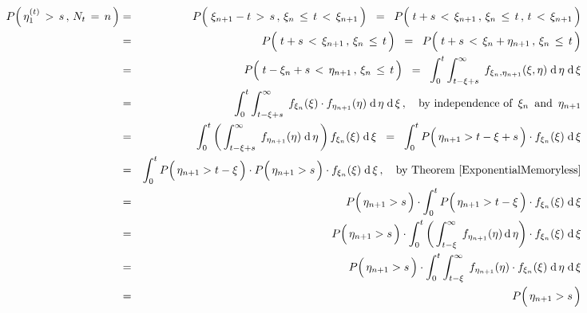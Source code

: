 \begin{eqnarray*}
P\!\left(\,\eta^{(t)}_{1}\,>\,s\,,\,N_{t}\,=\,n\,\right)
& = &
	P\!\left(\;
		\xi_{n+1}-t\,>\,s
		\,,\,
		\xi_{n} \,\overset{{\color{white}.}}{\leq}\, t \,<\, \xi_{n+1}
		\,\right)
\;\; = \;\;
	P\!\left(\;
		t+s\,<\,\xi_{n+1}
		\,,\,
		\xi_{n} \,\overset{{\color{white}.}}{\leq}\, t
		\,,\,
		t \,<\, \xi_{n+1}
		\,\right)
\\
& = &
	P\!\left(\;
		t+s\,<\,\xi_{n+1}
		\,,\,
		\xi_{n} \,\overset{{\color{white}.}}{\leq}\, t
		\,\right)
\;\; = \;\;
	P\!\left(\;
		t+s\,<\,\xi_{n} + \eta_{n+1}
		\,,\,
		\xi_{n} \,\overset{{\color{white}.}}{\leq}\, t
		\,\right)
\\
& = &
	P\!\left(\;
		t-\xi_{n}+s\,<\,\eta_{n+1}
		\,,\,
		\xi_{n} \,\overset{{\color{white}.}}{\leq}\, t
		\,\right)
\;\; = \;\;
	\int_{0}^{t}\int_{t-\xi+s}^{\infty}\;
		f_{\xi_{n},\eta_{n+1}}(\xi,\eta)
		\;\d\,\eta\;\d\,\xi
\\
& = &
	\int_{0}^{t}\int_{t-\xi+s}^{\infty}\;
		f_{\xi_{n}}(\xi) \cdot f_{\eta_{n+1}}(\eta)
		\;\d\,\eta\;\d\,\xi\,,
	\quad
	\textnormal{by independence of \,$\xi_{n}$\, and \,$\eta_{n+1}$}
\\
& = &
	\int_{0}^{t}
		\left(\,\int_{t-\xi+s}^{\infty}\; f_{\eta_{n+1}}(\eta) \;\d\,\eta \,\right)
		f_{\xi_{n}}(\xi)
		\;\d\,\xi
\;\; = \;\;
	\int_{0}^{t}
		P\!\left(\,\eta_{n+1} \overset{{\color{white}.}}{>} t-\xi+s\,\right)
		\cdot
		f_{\xi_{n}}(\xi)
		\;\d\,\xi
\\
& = &
	\int_{0}^{t}
		P\!\left(\,\eta_{n+1} \overset{{\color{white}.}}{>} t-\xi\,\right)
		\cdot
		P\!\left(\,\eta_{n+1} \overset{{\color{white}.}}{>} s\,\right)
		\cdot
		f_{\xi_{n}}(\xi)
		\;\d\,\xi\,,
		\quad
		\textnormal{by Theorem \ref{ExponentialMemoryless}}
\\
& = &
	P\!\left(\,\eta_{n+1} \overset{{\color{white}.}}{>} s\,\right)
	\cdot
	\int_{0}^{t}
		P\!\left(\,\eta_{n+1} \overset{{\color{white}.}}{>} t-\xi\,\right)
		\cdot
		f_{\xi_{n}}(\xi)
		\;\d\,\xi
\\
& = &
	P\!\left(\,\eta_{n+1} \overset{{\color{white}.}}{>} s\,\right)
	\cdot
	\int_{0}^{t}
		\left(\,\int_{t-\xi}^{\infty}\;
		f_{\eta_{n+1}}(\eta)
		\,\d\,\eta
		\right)
		\cdot
		f_{\xi_{n}}(\xi)
		\;\d\,\xi
\\
& = &
	P\!\left(\,\eta_{n+1} \overset{{\color{white}.}}{>} s\,\right)
	\cdot
	\int_{0}^{t}\int_{t-\xi}^{\infty}\;
		f_{\eta_{n+1}}(\eta) \cdot f_{\xi_{n}}(\xi)
		\;\d\,\eta\;\d\,\xi
\\
& = &
	P\!\left(\,\eta_{n+1} \overset{{\color{white}.}}{>} s\,\right)

\end{eqnarray*}

